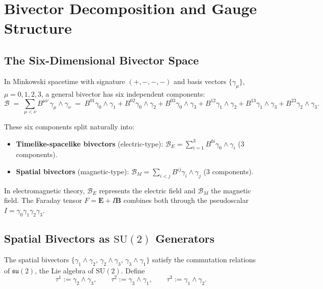 \documentclass[11pt,a4paper]{article}
\newcommand{\Biv}{\mathcal{B}}
\newcommand{\SU}{\mathrm{SU}}
\theoremstyle{definition}
\theoremstyle{plain}
\theoremstyle{remark}
\begin{document}
\vspace{1em}

\section{Bivector Decomposition and Gauge Structure}\label{sec:bivector-decomposition}

\subsection{The Six-Dimensional Bivector Space}

In Minkowski spacetime with signature $(+,-,-,-)$ and basis vectors $\{\gamma_\mu\}$, $\mu = 0,1,2,3$, a general bivector has six independent components:
\begin{equation}
  \Biv \;=\; \sum_{\mu<\nu} B^{\mu\nu}\, \gamma_\mu \wedge \gamma_\nu
  \;=\; B^{01}\gamma_0\wedge\gamma_1 + B^{02}\gamma_0\wedge\gamma_2 + B^{03}\gamma_0\wedge\gamma_3
  + B^{12}\gamma_1\wedge\gamma_2 + B^{13}\gamma_1\wedge\gamma_3 + B^{23}\gamma_2\wedge\gamma_3.
\end{equation}

These six components split naturally into:
\begin{itemize}[leftmargin=*,itemsep=3pt]
  \item \textbf{Timelike-spacelike bivectors} (electric-type): $\Biv_E = \sum_{i=1}^3 B^{0i}\gamma_0\wedge\gamma_i$ (3 components).
  \item \textbf{Spatial bivectors} (magnetic-type): $\Biv_M = \sum_{i<j} B^{ij}\gamma_i\wedge\gamma_j$ (3 components).
\end{itemize}

In electromagnetic theory, $\Biv_E$ represents the electric field and $\Biv_M$ the magnetic field. The Faraday tensor $F = \mathbf{E} + I\mathbf{B}$ combines both through the pseudoscalar $I = \gamma_0\gamma_1\gamma_2\gamma_3$.

\subsection{Spatial Bivectors as $\SU(2)$ Generators}

The spatial bivectors $\{\gamma_1\wedge\gamma_2,\, \gamma_2\wedge\gamma_3,\, \gamma_3\wedge\gamma_1\}$ satisfy the commutation relations of $\mathfrak{su}(2)$, the Lie algebra of $\SU(2)$. Define
\begin{equation}
  \tau^1 := \gamma_2\wedge\gamma_3, \qquad
  \tau^2 := \gamma_3\wedge\gamma_1, \qquad
  \tau^3 := \gamma_1\wedge\gamma_2.
  \label{eq:su2-generators}
\end{equation}
\end{document}
